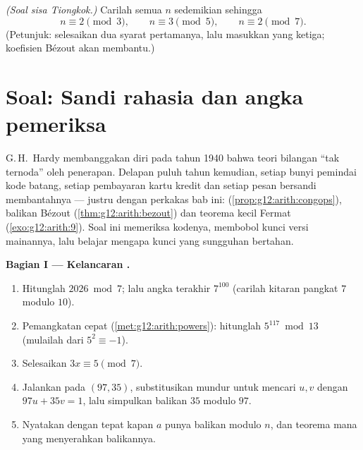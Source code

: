 \begin{exercise}[$\star\star\star$]\label{exo:g12:arith:10}
\emph{(Soal sisa Tiongkok.)} Carilah semua  $n$ sedemikian sehingga
\[
n \equiv 2 \pmod 3, \qquad n \equiv 3 \pmod 5, \qquad n \equiv 2 \pmod 7 .
\]
(Petunjuk: selesaikan dua syarat pertamanya, lalu masukkan yang ketiga; koefisien
Bézout akan membantu.)
\end{exercise}

\section{Soal: Sandi rahasia dan angka pemeriksa}

\begin{problem}
\label{pb:g12:arith:1}
G.\,H.~Hardy membanggakan diri pada tahun 1940 bahwa teori bilangan ``tak ternoda''
oleh penerapan. Delapan puluh tahun kemudian, setiap bunyi pemindai kode batang, setiap
pembayaran kartu kredit dan setiap pesan bersandi membantahnya
--- justru dengan perkakas bab ini: 
(\cref{prop:g12:arith:congops}), balikan Bézout
(\cref{thm:g12:arith:bezout}) dan teorema kecil Fermat
(\cref{exo:g12:arith:9}). Soal ini memeriksa kodenya, membobol
kunci versi mainannya, lalu belajar mengapa kunci yang sungguhan bertahan.

\medskip
\noindent\textbf{Bagian I --- Kelancaran .}
\begin{enumerate}
  \item Hitunglah $2026 \bmod 7$; lalu angka terakhir
        $7^{100}$ (carilah kitaran pangkat $7$ modulo
        $10$).
  \item Pemangkatan cepat (\cref{met:g12:arith:powers}):
        hitunglah $5^{117} \bmod 13$ (mulailah dari
        $5^2 \equiv -1$).
  \item Selesaikan $3x \equiv 5 \pmod 7$.
  \item Jalankan  pada $(97, 35)$, substitusikan mundur
        untuk mencari  $u, v$ dengan $97u + 35v = 1$, lalu
        simpulkan balikan $35$ modulo $97$.
  \item Nyatakan dengan tepat kapan $a$ punya balikan modulo $n$, dan
        teorema mana yang menyerahkan balikannya.
\end{enumerate}


\end{problem}
